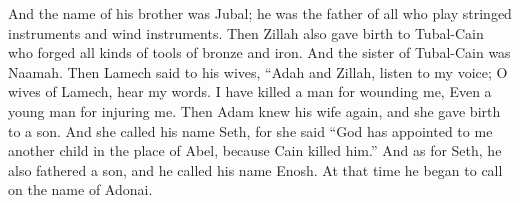 \begin{biblechapter}
\verse And the name of his brother was Jubal; he was the father of all who play stringed instruments and wind instruments.
\verse Then Zillah also gave birth to Tubal-Cain who forged all kinds of tools of bronze and iron. And the sister of Tubal-Cain was Naamah.
\verse Then Lamech said to his wives,
\verse “Adah and Zillah, listen to my voice; 
O wives of Lamech, hear my words. 
I have killed a man for wounding me, 
Even a young man for injuring me.
\verse Then Adam knew his wife again, and she gave birth to a son. And she called his name Seth, for she said “God has appointed to me another child in the place of Abel, because Cain killed him.”
\verse And as for Seth, he also fathered a son, and he called his name Enosh. At that time he began to call on the name of Adonai.
\end{biblechapter}

